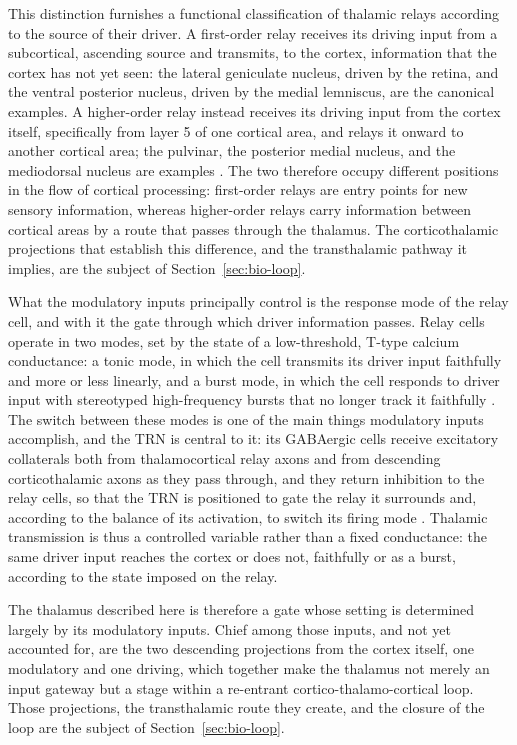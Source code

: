 This distinction furnishes a functional classification of thalamic relays according to the source of their driver. A first-order relay 
receives its driving input from a subcortical, ascending source and transmits, to the cortex, information that the cortex has not yet 
seen: the lateral geniculate nucleus, driven by the retina, and the ventral posterior nucleus, driven by the medial lemniscus, are the 
canonical examples. A higher-order relay instead receives its driving input from the cortex itself, specifically from layer 5 of one cortical area, and relays it onward to another cortical area; the pulvinar, the posterior medial nucleus, and the mediodorsal nucleus 
are examples \parencite{sherman2013}. The two therefore occupy different positions in the flow of cortical processing: first-order 
relays are entry points for new sensory information, whereas higher-order relays carry information between cortical areas by a route 
that passes through the thalamus. The corticothalamic projections that establish this difference, and the transthalamic pathway it 
implies, are the subject of Section~\ref{sec:bio-loop}.

What the modulatory inputs principally control is the response mode of the relay cell, and with it the gate through which driver 
information passes. Relay cells operate in two modes, set by the state of a low-threshold, T-type calcium conductance: a tonic mode, 
in which the cell transmits its driver input faithfully and more or less linearly, and a burst mode, in which the cell responds to 
driver input with stereotyped high-frequency bursts that no longer track it faithfully \parencite{sherman1998, sherman2013}. The switch 
between these modes is one of the main things modulatory inputs accomplish, and the TRN is central to it: its GABAergic cells receive 
excitatory collaterals both from thalamocortical relay axons and from descending corticothalamic axons as they pass through, and they 
return inhibition to the relay cells, so that the TRN is positioned to gate the relay it surrounds and, according to the balance of its activation, to switch its firing mode \parencite{sherman2013, shepherd2018}. Thalamic transmission is thus a controlled variable 
rather than a fixed conductance: the same driver input reaches the cortex or does not, faithfully or as a burst, according to the state
 imposed on the relay.

The thalamus described here is therefore a gate whose setting is determined largely by its modulatory inputs. Chief among those inputs,
 and not yet accounted for, are the two descending projections from the cortex itself, one modulatory and one driving, which together
  make the thalamus not merely an input gateway but a stage within a re-entrant cortico-thalamo-cortical loop. Those projections, the 
  transthalamic route they create, and the closure of the loop are the subject of Section~\ref{sec:bio-loop}.

